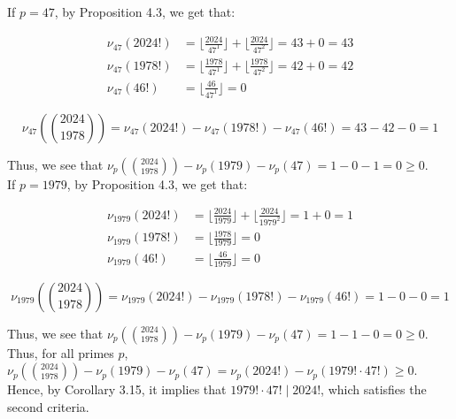 \documentclass{article}
\begin{document}
\begin{enumerate}[leftmargin=*, label=\arabic*.]
\begin{enumerate}[label=\alph*)]
    If $p = 47$, by Proposition 4.3, we get that:
    
    \begin{align*}
    \nu_{47}(2024!) &= \Big\lfloor \frac{2024}{47^1} \Big\rfloor + \Big\lfloor \frac{2024}{47^2} \Big\rfloor = 43 + 0 = 43\\
    \nu_{47}(1978!) &= \Big\lfloor \frac{1978}{47^1} \Big\rfloor + \Big\lfloor \frac{1978}{47^2} \Big\rfloor = 42 + 0 = 42\\
    \nu_{47}(46!) &= \Big\lfloor \frac{46}{47^1} \Big\rfloor = 0
    \end{align*}
    
    $$
    \nu_{47}(\binom{2024}{1978}) = \nu_{47}(2024!) - \nu_{47}(1978!) - \nu_{47}(46!) = 43 - 42 - 0 = 1
    $$
    
    Thus, we see that $\nu_p(\binom{2024}{1978}) - \nu_p(1979) - \nu_p(47) = 1 - 0 - 1 = 0 \geq 0$.\\
    
    If $p = 1979$, by Proposition 4.3, we get that:
    
    \begin{align*}
    \nu_{1979}(2024!) &= \Big\lfloor \frac{2024}{1979} \Big\rfloor + \Big\lfloor \frac{2024}{1979^2} \Big\rfloor = 1 + 0 = 1\\
    \nu_{1979}(1978!) &= \Big\lfloor \frac{1978}{1979} \Big\rfloor = 0\\
    \nu_{1979}(46!) &= \Big\lfloor \frac{46}{1979} \Big\rfloor = 0
    \end{align*}
    
    $$
    \nu_{1979}(\binom{2024}{1978}) = \nu_{1979}(2024!) - \nu_{1979}(1978!) - \nu_{1979}(46!) = 1 - 0 - 0 = 1
    $$
    
    Thus, we see that $\nu_p(\binom{2024}{1978}) - \nu_p(1979) - \nu_p(47) = 1 - 1 - 0 = 0 \geq 0$. Thus, for all primes $p$,  $\nu_p(\binom{2024}{1978}) - \nu_p(1979) - \nu_p(47) = \nu_p(2024!) - \nu_p(1979! \cdot 47!) \geq 0$. Hence, by Corollary 3.15, it implies that $1979! \cdot 47! \mid 2024!$, which satisfies the second criteria.


    

\end{enumerate}
\end{enumerate}
\end{document}

